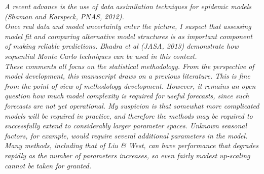 \documentclass{article}
\begin{document}
\noindent \emph{A recent advance is the use of data assimilation techniques for epidemic models (Shaman and Karspeck, PNAS, 2012).} \\

\noindent \emph{Once real data and model uncertainty enter the picture, I suspect that assessing model fit and comparing alternative model structures is as important component of making reliable predictions. Bhadra et al (JASA, 2013) demonstrate how sequential Monte Carlo techniques can be used in this context.} \\

\noindent \emph{These comments all focus on the statistical methodology. From the perspective of model development, this manuscript draws on a previous literature. This is fine from the point of view of methodology development. However, it remains an open question how much model complexity is required for useful forecasts, since such forecasts are not yet operational. My suspicion is that somewhat more complicated models will be required in practice, and therefore the methods may be required to successfully extend to considerably larger parameter spaces. Unknown seasonal factors, for example, would require several additional parameters in the model. Many methods, including that of Liu \& West, can have performance that degrades rapidly as the number of parameters increases, so even fairly modest up-scaling cannot be taken for granted.} \\
\end{document}
